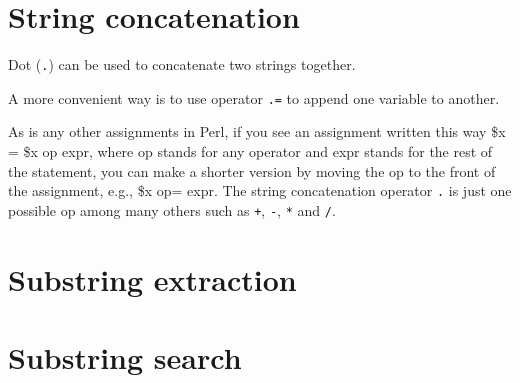 \documentclass[]{book}
\makeatletter
\newenvironment{Shaded}{\begin{snugshade}}{\end{snugshade}}
\newcommand{\DataTypeTok}[1]{\textcolor[rgb]{0.13,0.29,0.53}{#1}}
\newcommand{\DecValTok}[1]{\textcolor[rgb]{0.00,0.00,0.81}{#1}}
\newcommand{\CommentTok}[1]{\textcolor[rgb]{0.56,0.35,0.01}{\textit{#1}}}
\newcommand{\NormalTok}[1]{#1}
\newenvironment{kframe}{%
\medskip{}
\setlength{\fboxsep}{.8em}
 \def\at@end@of@kframe{}%
 \ifinner\ifhmode%
  \def\at@end@of@kframe{\end{minipage}}%
  \begin{minipage}{\columnwidth}%
 \fi\fi%
 \def\FrameCommand##1{\hskip\@totalleftmargin \hskip-\fboxsep
 \colorbox{shadecolor}{##1}\hskip-\fboxsep
     \hskip-\linewidth \hskip-\@totalleftmargin \hskip\columnwidth}%
 \MakeFramed {\advance\hsize-\width
   \@totalleftmargin\z@ \linewidth\hsize
   \@setminipage}}%
 {\par\unskip\endMakeFramed%
 \at@end@of@kframe}
\renewenvironment{Shaded}{\begin{kframe}}{\end{kframe}}
\theoremstyle{definition}
\theoremstyle{definition}
\theoremstyle{definition}
\theoremstyle{remark}
\makeatother
\begin{document}
\section{String concatenation}\label{string-concatenation}

Dot (\texttt{.}) can be used to concatenate two strings together.

\begin{Shaded}
\end{Shaded}

A more convenient way is to use operator \texttt{.=} to append one
variable to another.

As is any other assignments in Perl, if you see an assignment written
this way \$x = \$x op expr, where op stands for any operator and expr
stands for the rest of the statement, you can make a shorter version by
moving the op to the front of the assignment, e.g., \$x op= expr. The
string concatenation operator \texttt{.} is just one possible op among
many others such as \texttt{+}, \texttt{-}, \texttt{*} and \texttt{/}.

\begin{Shaded}
\end{Shaded}

\section{Substring extraction}\label{substring-extraction}

\section{Substring search}\label{substring-search}
\end{document}
